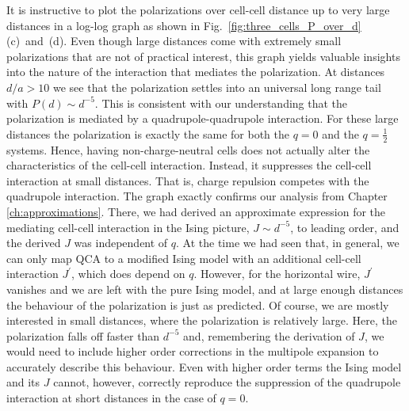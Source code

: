 It is instructive to plot the polarizations over cell-cell distance up to very
large distances in a log-log graph as shown in
Fig.~\ref{fig:three_cells_P_over_d}(c)~and~(d). Even though large distances come
with extremely small polarizations that are not of practical interest, this
graph yields valuable insights into the nature of the interaction that mediates
the polarization. At distances $d/a > 10$ we see that the polarization settles
into an universal long range tail with $P(d) \sim d^{-5}$. This is consistent
with our understanding that the polarization is mediated by a
quadrupole-quadrupole interaction. For these large distances the polarization is
exactly the same for both the $q=0$ and the $q=\frac{1}{2}$ systems. Hence,
having non-charge-neutral cells does not actually alter the characteristics of
the cell-cell interaction. Instead, it suppresses the cell-cell interaction at
small distances. That is, charge repulsion competes with the quadrupole
interaction. The graph exactly confirms our analysis from Chapter
\ref{ch:approximations}. There, we had derived an approximate expression for the
mediating cell-cell interaction in the Ising picture, $J \sim d^{-5}$, to
leading order, and the derived $J$ was independent of $q$. At the time we had
seen that, in general, we can only map QCA to a modified Ising model with an
additional cell-cell interaction $J^{\prime}$, which does depend on $q$.
However, for the horizontal wire, $J^{\prime}$ vanishes and we are left with the
pure Ising model, and at large enough distances the behaviour of the
polarization is just as predicted. Of course, we are mostly interested in small
distances, where the polarization is relatively large. Here, the polarization
falls off faster than $d^{-5}$ and, remembering the derivation of $J$, we would
need to include higher order corrections in the multipole expansion to
accurately describe this behaviour. Even with higher order terms the Ising model
and its $J$ cannot, however, correctly reproduce the suppression of the
quadrupole interaction at short distances in the case of $q=0$.

